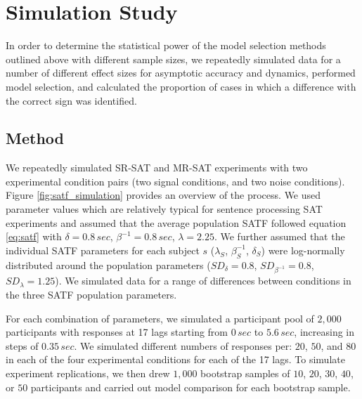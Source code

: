 \documentclass[10pt,letterpaper]{article}
\begin{document}
\section{Simulation Study}\label{our-simulations}

In order to determine the statistical power of the model selection methods outlined above with different sample sizes, we repeatedly simulated data for a number of different effect sizes for asymptotic accuracy and dynamics, performed model selection, and calculated the proportion of cases in which a difference with the correct sign was identified.

\subsection{Method}\label{method}

We repeatedly simulated SR-SAT and MR-SAT experiments with two experimental condition pairs (two signal conditions, and two noise conditions). Figure \ref{fig:satf_simulation} provides an overview of the process. We used parameter values which are relatively typical for sentence processing SAT experiments and assumed that the average population SATF followed equation \ref{eq:satf} with \(\delta=0.8\,sec\), \(\beta^{-1}=0.8\,sec\), \(\lambda=2.25\). We further assumed that the individual SATF parameters for each subject \(s\) (\(\lambda_S\), \(\beta^{-1}_S\), \(\delta_S\)) were log-normally distributed around the population parameters (\(SD_{\delta}=0.8\), \(SD_{\beta^{-1}}=0.8\), \(SD_{\lambda}=1.25\)). We simulated data for a range of differences between conditions in the three SATF population parameters.



For each combination of parameters, we simulated a participant pool of \(2,000\) participants with responses at 17 lags starting from \(0\,sec\) to \(5.6\,sec\), increasing in steps of \(0.35\,sec\). We simulated different numbers of responses per: \(20\), \(50\), and \(80\) in each of the four experimental conditions for each of the 17 lags. To simulate experiment replications, we then drew $1,000$ bootstrap samples of $10$, $20$, $30$, $40$, or $50$ participants and carried out model comparison for each bootstrap sample.  
\end{document}
